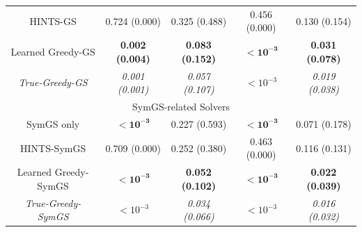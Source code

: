 \documentclass{article}
\begin{document}
\begin{table}[]
{\begin{tabular}{ccccc}
        HINTS-GS & 0.724 (0.000) & 0.325 (0.488) & 0.456 (0.000) & 0.130 (0.154) \\
        Learned Greedy-GS & \textbf{0.002 (0.004)} &  \textbf{0.083 (0.152)} & $\mathbf{<10^{-3}}$ &  \textbf{0.031 (0.078)} \\
        \textit{True-Greedy-GS} & \textit{0.001 (0.001)} & \textit{0.057 (0.107)} & $\mathit{<10^{-3}}$ & \textit{0.019 (0.038)} \\
        \hline
         \multicolumn{5}{c}{SymGS-related Solvers} \\
         \hline
         SymGS only & $\mathbf{<10^{-3}}$ & 0.227 (0.593) & $\mathbf{<10^{-3}}$ & 0.071 (0.178) \\
        HINTS-SymGS & 0.709 (0.000) & 0.252 (0.380) & 0.463 (0.000) & 0.116 (0.131) \\
        Learned Greedy-SymGS & $\mathbf{<10^{-3}}$ &  \textbf{0.052 (0.102)} & $\mathbf{<10^{-3}}$ &  \textbf{0.022 (0.039) }\\
        \textit{True-Greedy-SymGS} & $\mathit{<10^{-3}}$ & \textit{0.034 (0.066)} & $\mathit{<10^{-3}}$ & \textit{0.016 (0.032)} \\
         \hline
    \end{tabular}
    }
    \label{tab:errorcomparison}
\end{table}
\end{document}
